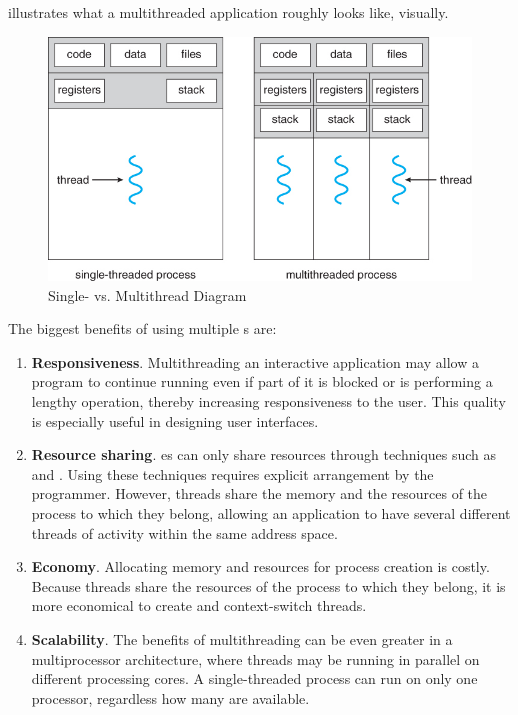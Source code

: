  illustrates what a multithreaded application roughly looks like, visually.
\begin{figure}[h!tbp]
  \centering
  \includegraphics[scale=0.85]{./Drawings/EDAF35-Operating_Systems/ThreadDiagram.jpg}
  \caption{Single- vs. Multithread Diagram}
  \label{fig:Thread_Diagram}
\end{figure}

The biggest benefits of using multiple s are:
\begin{enumerate}[noitemsep]
\item \textbf{Responsiveness}.
  Multithreading an interactive application may allow a program to continue running even if part of it is blocked or is performing a lengthy operation, thereby increasing responsiveness to the user.
  This quality is especially useful in designing user interfaces.
\item \textbf{Resource sharing}.
  es can only share resources through techniques such as  and .
  Using these techniques requires explicit arrangement by the programmer.
  However, threads share the memory and the resources of the process to which they belong, allowing an application to have several different threads of activity within the same address space.
\item \textbf{Economy}.
  Allocating memory and resources for process creation is costly.
  Because threads share the resources of the process to which they belong, it is more economical to create and context-switch threads.
\item \textbf{Scalability}.
  The benefits of multithreading can be even greater in a multiprocessor architecture, where threads may be running in parallel on different processing cores.
  A single-threaded process can run on only one processor, regardless how many are available.
\end{enumerate}

